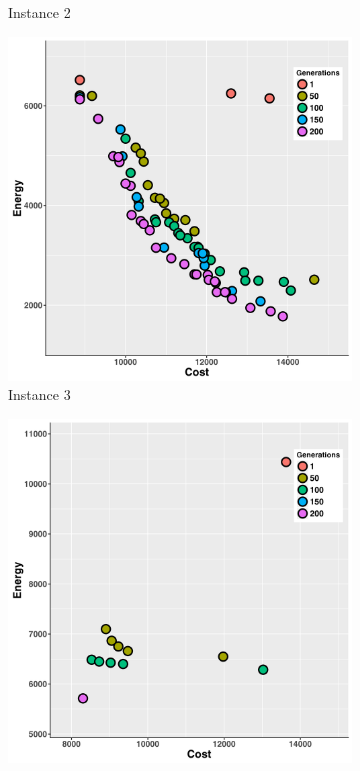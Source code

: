 \begin{figure}
\begin{subfigure}[b]{0.45\textwidth}
   \caption{Instance 2}
   \label{fig:b}
   \end{subfigure}
   \begin{subfigure}[b]{0.45\textwidth}\includegraphics[width=\textwidth]{pics/preliminary/without/testCase3_.png}
   \caption{Instance 3}
   \label{fig:c}
   \end{subfigure}
   \begin{subfigure}[b]{0.45\textwidth}\includegraphics[width=\textwidth]{pics/preliminary/without/testCase4_.png}

\end{subfigure}
\end{figure}
